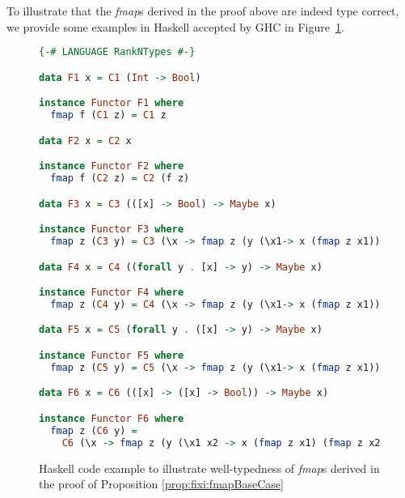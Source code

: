 To illustrate that the \textit{fmap}s derived in the proof above are indeed
type correct, we provide some examples in Haskell accepted by GHC in
Figure~\ref{fig:deriveFunctor}.
\begin{figure}
\begin{singlespace}
\begin{lstlisting}[basicstyle={\ttfamily\small},language=Haskell,mathescape]
{-# LANGUAGE RankNTypes #-}

data F1 x = C1 (Int -> Bool)

instance Functor F1 where
  fmap f (C1 z) = C1 z

data F2 x = C2 x

instance Functor F2 where
  fmap f (C2 z) = C2 (f z)

data F3 x = C3 (([x] -> Bool) -> Maybe x)

instance Functor F3 where
  fmap z (C3 y) = C3 (\x -> fmap z (y (\x1-> x (fmap z x1))))

data F4 x = C4 ((forall y . [x] -> y) -> Maybe x)

instance Functor F4 where
  fmap z (C4 y) = C4 (\x -> fmap z (y (\x1-> x (fmap z x1))))

data F5 x = C5 (forall y . ([x] -> y) -> Maybe x)

instance Functor F5 where
  fmap z (C5 y) = C5 (\x -> fmap z (y (\x1-> x (fmap z x1))))

data F6 x = C6 (([x] -> ([x] -> Bool)) -> Maybe x)

instance Functor F6 where
  fmap z (C6 y) =
    C6 (\x -> fmap z (y (\x1 x2 -> x (fmap z x1) (fmap z x2))))
\end{lstlisting}
\end{singlespace}
\caption{Haskell code example to illustrate well-typedness of \textit{fmap}s
	derived in the proof of Proposition \ref{prop:fixi:fmapBaseCase}}
\label{fig:deriveFunctor}
\end{figure}

